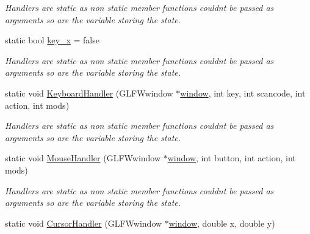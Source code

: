 \begin{DoxyCompactItemize}
\begin{DoxyCompactList}\small\item\em Handlers are static as non static member functions couldn\textquotesingle{}t be passed as arguments so are the variable storing the state. \end{DoxyCompactList}\item 
static bool \hyperlink{classcft_1_1Scene_a207a97d3447062efe5e4bee1b8183621}{key\+\_\+x} = false\hypertarget{classcft_1_1Scene_a207a97d3447062efe5e4bee1b8183621}{}\label{classcft_1_1Scene_a207a97d3447062efe5e4bee1b8183621}

\begin{DoxyCompactList}\small\item\em Handlers are static as non static member functions couldn\textquotesingle{}t be passed as arguments so are the variable storing the state. \end{DoxyCompactList}\item 
static void \hyperlink{classcft_1_1Scene_a9752847202079b0f50548fc3a00ab459}{Keyboard\+Handler} (G\+L\+F\+Wwindow $\ast$\hyperlink{classcft_1_1Scene_a5743ac5a5872b962da380e6b8262a347}{window}, int key, int scancode, int action, int mods)\hypertarget{classcft_1_1Scene_a9752847202079b0f50548fc3a00ab459}{}\label{classcft_1_1Scene_a9752847202079b0f50548fc3a00ab459}

\begin{DoxyCompactList}\small\item\em Handlers are static as non static member functions couldn\textquotesingle{}t be passed as arguments so are the variable storing the state. \end{DoxyCompactList}\item 
static void \hyperlink{classcft_1_1Scene_aaa02e5aeb0097c1a39a66880a467c1e3}{Mouse\+Handler} (G\+L\+F\+Wwindow $\ast$\hyperlink{classcft_1_1Scene_a5743ac5a5872b962da380e6b8262a347}{window}, int button, int action, int mods)\hypertarget{classcft_1_1Scene_aaa02e5aeb0097c1a39a66880a467c1e3}{}\label{classcft_1_1Scene_aaa02e5aeb0097c1a39a66880a467c1e3}

\begin{DoxyCompactList}\small\item\em Handlers are static as non static member functions couldn\textquotesingle{}t be passed as arguments so are the variable storing the state. \end{DoxyCompactList}\item 
static void \hyperlink{classcft_1_1Scene_ab95660d6aa71906634bb7ee61c6c00d1}{Cursor\+Handler} (G\+L\+F\+Wwindow $\ast$\hyperlink{classcft_1_1Scene_a5743ac5a5872b962da380e6b8262a347}{window}, double x, double y)\hypertarget{classcft_1_1Scene_ab95660d6aa71906634bb7ee61c6c00d1}{}\label{classcft_1_1Scene_ab95660d6aa71906634bb7ee61c6c00d1}


\end{DoxyCompactItemize}
